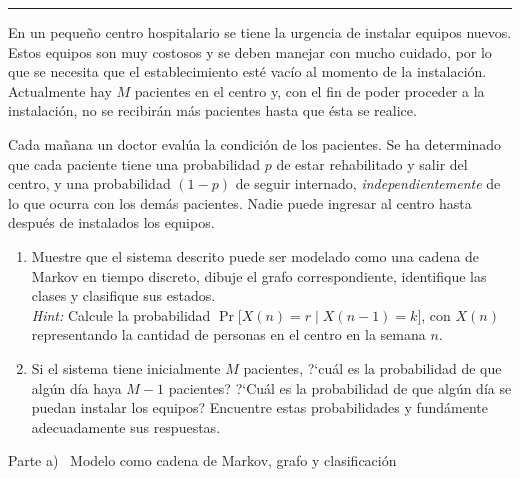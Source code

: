 \documentclass[10pt,a4paper]{article}
\newcommand{\parteheader}[1]{%
  \vspace{8pt}\needspace{4cm}\noindent
  \begin{tcolorbox}[
    colback=subsecbg!18, colframe=subsecbg!55,
    sharp corners, boxrule=0.4pt,
    left=6pt, right=6pt, top=3pt, bottom=3pt,
    fontupper=\small\bfseries\sffamily,
  ]
  #1
  \end{tcolorbox}\vspace{2pt}%
}
\newenvironment{enunciado}[1]{%
  \begin{tcolorbox}[
    breakable,
    colback=sectionbg!8, colframe=sectionbg,
    boxrule=0.8pt, arc=3pt, left=8pt, right=8pt, top=6pt, bottom=6pt,
    fonttitle=\normalsize\bfseries\sffamily, coltitle=white, colbacktitle=sectionbg, titlerule=0pt,
    title={#1},
  ]%
}{\end{tcolorbox}}
\begin{document}
\vspace{10pt}
{\color{subsecbg!60}\hrule}
\vspace{6pt}

\begin{enunciado}{Problema 7 \textperiodcentered\ Centro hospitalario: instalaci\'on de equipos}
  En un peque\~no centro hospitalario se tiene la urgencia de instalar equipos nuevos.
  Estos equipos son muy costosos y se deben manejar con mucho cuidado, por lo que se
  necesita que el establecimiento est\'e vac\'io al momento de la instalaci\'on.
  Actualmente hay $M$ pacientes en el centro y, con el fin de poder proceder a la
  instalaci\'on, no se recibir\'an m\'as pacientes hasta que \'esta se realice.

  Cada ma\~nana un doctor eval\'ua la condici\'on de los pacientes. Se ha determinado
  que cada paciente tiene una probabilidad $p$ de estar rehabilitado y salir del
  centro, y una probabilidad $(1-p)$ de seguir internado, \emph{independientemente}
  de lo que ocurra con los dem\'as pacientes. Nadie puede ingresar al centro hasta
  despu\'es de instalados los equipos.

  \smallskip
  \begin{enumerate}[label=\alph*)]
    \item Muestre que el sistema descrito puede ser modelado como una cadena de
          Markov en tiempo discreto, dibuje el grafo correspondiente, identifique
          las clases y clasifique sus estados.\\[2pt]
          \textit{Hint:} Calcule la probabilidad
          $\Pr\!\bigl[X(n)=r\mid X(n-1)=k\bigr]$, con $X(n)$ representando la
          cantidad de personas en el centro en la semana $n$.
    \item Si el sistema tiene inicialmente $M$ pacientes, ?`cu\'al es la probabilidad
          de que alg\'un d\'ia haya $M-1$ pacientes? ?`Cu\'al es la probabilidad de
          que alg\'un d\'ia se puedan instalar los equipos? Encuentre estas
          probabilidades y fund\'amente adecuadamente sus respuestas.
  \end{enumerate}
\end{enunciado}

\vspace{6pt}

\parteheader{Parte a) \textperiodcentered\ Modelo como cadena de Markov, grafo y clasificaci\'on}
\end{document}
